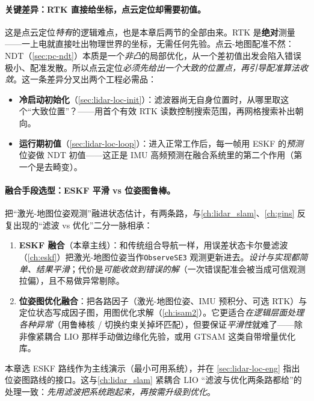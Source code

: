 \paragraph{关键差异：RTK 直接给坐标，点云定位却需要初值。}
这是点云定位\emph{特有}的逻辑难点，也是本章后两节的全部由来。RTK 是\textbf{绝对}测量——一上电就直接吐出物理世界的坐标，无需任何先验。点云-地图配准不然：NDT（\cref{sec:pc-ndt}）本质是一个\emph{非凸}的局部优化，从一个差初值出发会陷入错误极小、配准发散。所以点云定位\emph{必须先给出一个大致的位置点，再引导配准算法收敛}。这一条差异分叉出两个工程必需品：
\begin{itemize}
  \item \textbf{冷启动初始化}（\cref{sec:lidar-loc-init}）：滤波器尚无自身位置时，从哪里取这个“大致位置”？——用首个有效 RTK 读数控制搜索范围，再网格搜索补出朝向。
  \item \textbf{运行期初值}（\cref{sec:lidar-loc-loop}）：进入正常工作后，每一帧用 ESKF 的\emph{预测}位姿做 NDT 初值——这正是 IMU 高频预测在融合系统里的第二个作用（第一个是去畸变）。
\end{itemize}

\paragraph{融合手段选型：ESKF 平滑 vs 位姿图鲁棒。}
把“激光-地图位姿观测”融进状态估计，有两条路，与\cref{ch:lidar_slam}、\cref{ch:gins} 反复出现的“滤波 vs 优化”二分一脉相承：
\begin{enumerate}
  \item \textbf{ESKF 融合}（本章主线）：和传统组合导航一样，用误差状态卡尔曼滤波（\cref{ch:eskf}）把激光-地图位姿当作\texttt{ObserveSE3} 观测更新进去。\emph{设计与实现都简单、结果平滑}；代价是\emph{可能收敛到错误的解}（一次错误配准会被当成可信观测拉偏），且不易做异常剔除。
  \item \textbf{位姿图优化融合}：把各路因子（激光-地图位姿、IMU 预积分、可选 RTK）与定位状态写成因子图，用图优化求解（\cref{ch:isam2}）。它更适合\emph{在逻辑层面处理各种异常}（用鲁棒核 / 切换约束关掉坏匹配），但要保证\emph{平滑性}就难了——除非像紧耦合 LIO 那样手动做边缘化先验，或用 GTSAM 这类自带增量优化库。
\end{enumerate}
本章选 ESKF 路线作为主线演示（最小可用系统），并在 \cref{sec:lidar-loc-eng} 指出位姿图路线的接口。这与\cref{ch:lidar_slam} 紧耦合 LIO “滤波与优化两条路都给”的处理一致：\emph{先用滤波把系统跑起来，再按需升级到优化}。

